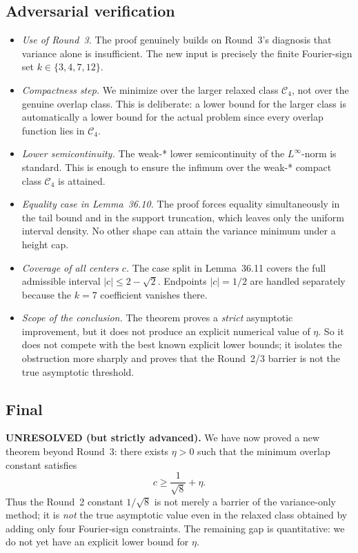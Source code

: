 \subsection{Adversarial verification}
\begin{itemize}
\item \emph{Use of Round~3.} The proof genuinely builds on Round~3's diagnosis that variance alone is insufficient. The new input is precisely the finite Fourier-sign set \(k\in\{3,4,7,12\}\).
\item \emph{Compactness step.} We minimize over the larger relaxed class \(\mathcal C_4\), not over the genuine overlap class. This is deliberate: a lower bound for the larger class is automatically a lower bound for the actual problem since every overlap function lies in \(\mathcal C_4\).
\item \emph{Lower semicontinuity.} The weak-* lower semicontinuity of the \(L^\infty\)-norm is standard. This is enough to ensure the infimum over the weak-* compact class \(\mathcal C_4\) is attained.
\item \emph{Equality case in Lemma~36.10.} The proof forces equality simultaneously in the tail bound and in the support truncation, which leaves only the uniform interval density. No other shape can attain the variance minimum under a height cap.
\item \emph{Coverage of all centers \(c\).} The case split in Lemma~36.11 covers the full admissible interval \(|c|\le 2-\sqrt 2\). Endpoints \(|c|=1/2\) are handled separately because the \(k=7\) coefficient vanishes there.
\item \emph{Scope of the conclusion.} The theorem proves a \emph{strict} asymptotic improvement, but it does not produce an explicit numerical value of \(\eta\). So it does not compete with the best known explicit lower bounds; it isolates the obstruction more sharply and proves that the Round~2/3 barrier is not the true asymptotic threshold.
\end{itemize}

\subsection{Final}
\textbf{UNRESOLVED (but strictly advanced).}
We have now proved a new theorem beyond Round~3:
there exists \(\eta>0\) such that the minimum overlap constant satisfies
\[
 c\ge \frac{1}{\sqrt 8}+\eta.
\]
Thus the Round~2 constant \(1/\sqrt 8\) is not merely a barrier of the variance-only method; it is \emph{not} the true asymptotic value even in the relaxed class obtained by adding only four Fourier-sign constraints.
The remaining gap is quantitative: we do not yet have an explicit lower bound for \(\eta\).

